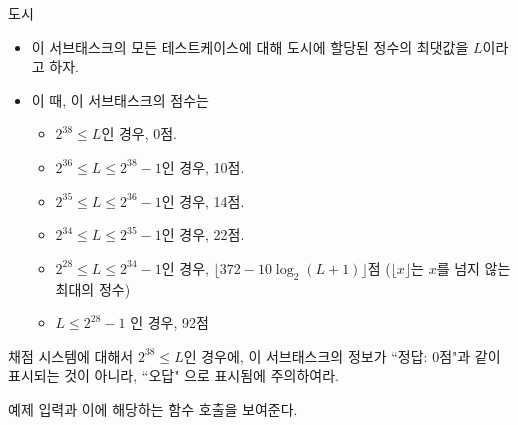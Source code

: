 \begin{problem}{도시}
	\begin{itemize}
		\item 이 서브태스크의 모든 테스트케이스에 대해 도시에 할당된 정수의 최댓값을 $L$이라고 하자.
		\item 이 때, 이 서브태스크의 점수는
		\begin{itemize}
			\item $2^{38} \le L$인 경우, 0점.
			\item $2^{36} \le L \le 2^{38}-1$인 경우, 10점.
			\item $2^{35} \le L \le 2^{36}-1$인 경우, 14점.
			\item $2^{34} \le L \le 2^{35}-1$인 경우, 22점.
			\item $2^{28} \le L \le 2^{34}-1$인 경우, $\lfloor372-10\log_2(L+1)\rfloor$점 ($\lfloor x \rfloor$는 $x$를 넘지 않는 최대의 정수)
			\item $L \le 2^{28}-1$ 인 경우, 92점
		\end{itemize}
	\end{itemize}
	
	채점 시스템에 대해서 $2^{38} \le L$인 경우에, 이 서브태스크의 정보가 ``정답: 0점"과 같이 표시되는 것이 아니라, ``오답" 으로 표시됨에 주의하여라.
	
	
	
	\Examples
	
	예제 입력과 이에 해당하는 함수 호출을 보여준다.
	
	
	

\end{problem}
